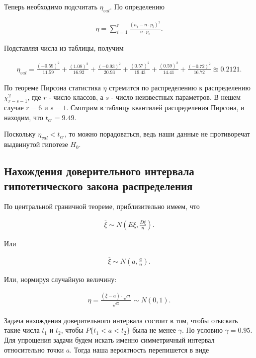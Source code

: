 \documentclass[14pt,a4paper]{scrartcl}
\theoremstyle{definition}
\theoremstyle{remark}
\theoremstyle{definition}
\theoremstyle{definition}
\begin{document}
Теперь необходимо подсчитать $\eta_{val}$. По определению

\begin{align*}
  \eta = \sum_{i=1}^{r} \frac{(n_{i} - n\cdot p_{i})^2}{n\cdot p_{i}}.
\end{align*}

Подставляя числа из таблицы, получим

\begin{align*}
  \eta_{val} = \frac{(-0.59)^2}{11.59} + \frac{(1.08)^2}{16.92} + \frac{(-0.93)^2}{20.93} + \frac{(0.57)^2}{19.43} + \frac{(0.59)^2}{14.41} + \frac{(-0.72)^2}{16.72} \approxeq 0.2121.
\end{align*}

По теореме Пирсона статистика $\eta$ стремится по распределению к распределению $\chi_{r-s-1}^2$, где $r$ - число классов, а $s$ - число неизвестных параметров. В нешем случае $r = 6$ и $s = 1$. Смотрим в таблицу квантилей распределения Пирсона, и находим, что $t_{cr} = 9.49.$

Поскольку $\eta_{val} < t_{cr}$, то можно порадоваться, ведь наши данные не противоречат выдвинутой гипотезе $H_{0}$.

\subsection{Нахождения доверительного интервала гипотетического закона распределения}

По центральной граничной теореме, приблизительно имеем, что

\begin{align*}
  \overline{\xi} \sim N(E\xi, \frac{D\xi}{n}).
\end{align*}

Или

\begin{align*}
  \overline{\xi} \sim N(a, \frac{a}{n}).
\end{align*}

Или, нормируя случайную величину:

\begin{align*}
  \eta = \frac{(\overline{\xi}-a)\cdot \sqrt{n}}{\sqrt{a}} \sim N(0, 1).
\end{align*}

Задача нахождения доверительного интервала состоит в том, чтобы отыскать такие числа $t_{1}$ и $t_{2}$, чтобы $P\{t_{1} < a < t_{2}\}$ была не менее $\gamma$. По условию $\gamma = 0.95$. Для упрощения задачи будем искать именно симметричный интервал относительно точки $a$. Тогда наша вероятность перепишется в виде
\end{document}
